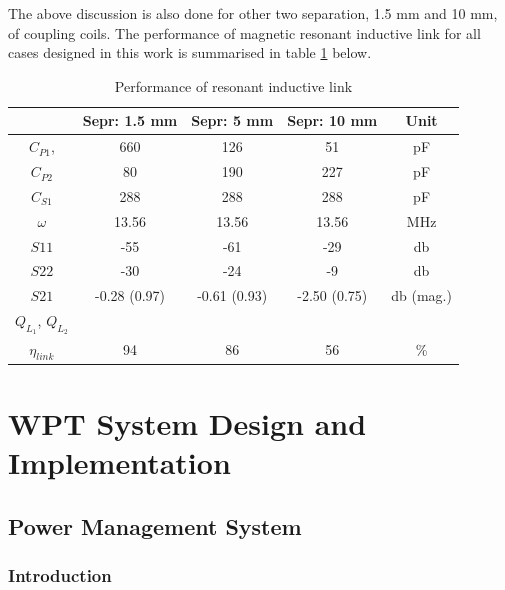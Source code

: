 \documentclass[UKenglish]{ifimaster}  %
\begin{document}
The above discussion is also done for other two separation, 1.5 mm and 10 mm, of coupling coils. The performance of magnetic resonant inductive link for all cases designed in this work is summarised in table \ref{tab:ant_spec} below. 

\begin{table}[H]
\caption{Performance of resonant inductive link} 
\begin{center}
\begin{tabular}{c|c|c|c|c}
\hline \hline
 								& \textbf{Sepr: 1.5 mm}	& \textbf{Sepr: 5 mm} 	& \textbf{Sepr: 10 mm}	& \textbf{Unit}		\\ \hline \hline
$C_{P1}$, 						& 660				& 126				& 51					& \si{\pico\farad}	\\ \hline
$C_{P2}$ 					 		& 80					& 190				& 227				& \si{\pico\farad}	\\ \hline
$C_{S1}$ 							& 288				&  288				& 288				& \si{\pico\farad}	\\ \hline
$\omega$							& 13.56				& 13.56				& 13.56				& \si{\mega\hertz}	\\ \hline
$S11$							& -55				& -61				& -29			  	& \si{\decibel}		\\ \hline
$S22$							& -30				& -24				& -9					& \si{\decibel} 		\\ \hline
$S21$							& -0.28 (0.97)			& -0.61 (0.93)			& -2.50 (0.75)			& \si{\decibel} (mag.)	\\ \hline
$Q_{L_{1}}$, $Q_{L_{2}}$			&					& 					& 					&		\\ \hline
$\eta_{link}$						& 94					& 86					& 56					& \% \\		
\hline \hline
\end{tabular}
\end{center}
\label{tab:ant_spec}
\end{table}%

\clearpage
\newpage


\part{WPT System Design and Implementation} 
\chapter{Power Management System}  
\section{Introduction}	%
\end{document}
